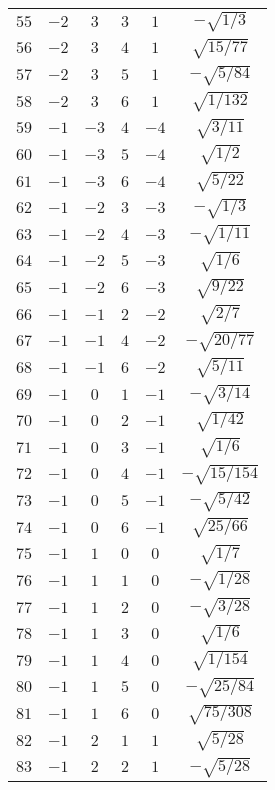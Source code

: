 \begin{table}
\begin{center}
\begin{tabular}{|c|c|c|c|c|c|}
$55$ & $-2$ & $3$ & $3$ & $1$ & $-\sqrt{1/3}$ \\ 
$56$ & $-2$ & $3$ & $4$ & $1$ & $\sqrt{15/77}$ \\ 
$57$ & $-2$ & $3$ & $5$ & $1$ & $-\sqrt{5/84}$ \\ 
$58$ & $-2$ & $3$ & $6$ & $1$ & $\sqrt{1/132}$ \\ 
$59$ & $-1$ & $-3$ & $4$ & $-4$ & $\sqrt{3/11}$ \\ 
$60$ & $-1$ & $-3$ & $5$ & $-4$ & $\sqrt{1/2}$ \\ 
$61$ & $-1$ & $-3$ & $6$ & $-4$ & $\sqrt{5/22}$ \\ 
$62$ & $-1$ & $-2$ & $3$ & $-3$ & $-\sqrt{1/3}$ \\ 
$63$ & $-1$ & $-2$ & $4$ & $-3$ & $-\sqrt{1/11}$ \\ 
$64$ & $-1$ & $-2$ & $5$ & $-3$ & $\sqrt{1/6}$ \\ 
$65$ & $-1$ & $-2$ & $6$ & $-3$ & $\sqrt{9/22}$ \\ 
$66$ & $-1$ & $-1$ & $2$ & $-2$ & $\sqrt{2/7}$ \\ 
$67$ & $-1$ & $-1$ & $4$ & $-2$ & $-\sqrt{20/77}$ \\ 
$68$ & $-1$ & $-1$ & $6$ & $-2$ & $\sqrt{5/11}$ \\ 
$69$ & $-1$ & $0$ & $1$ & $-1$ & $-\sqrt{3/14}$ \\ 
$70$ & $-1$ & $0$ & $2$ & $-1$ & $\sqrt{1/42}$ \\ 
$71$ & $-1$ & $0$ & $3$ & $-1$ & $\sqrt{1/6}$ \\ 
$72$ & $-1$ & $0$ & $4$ & $-1$ & $-\sqrt{15/154}$ \\ 
$73$ & $-1$ & $0$ & $5$ & $-1$ & $-\sqrt{5/42}$ \\ 
$74$ & $-1$ & $0$ & $6$ & $-1$ & $\sqrt{25/66}$ \\ 
$75$ & $-1$ & $1$ & $0$ & $0$ & $\sqrt{1/7}$ \\ 
$76$ & $-1$ & $1$ & $1$ & $0$ & $-\sqrt{1/28}$ \\ 
$77$ & $-1$ & $1$ & $2$ & $0$ & $-\sqrt{3/28}$ \\ 
$78$ & $-1$ & $1$ & $3$ & $0$ & $\sqrt{1/6}$ \\ 
$79$ & $-1$ & $1$ & $4$ & $0$ & $\sqrt{1/154}$ \\ 
$80$ & $-1$ & $1$ & $5$ & $0$ & $-\sqrt{25/84}$ \\ 
$81$ & $-1$ & $1$ & $6$ & $0$ & $\sqrt{75/308}$ \\ 
$82$ & $-1$ & $2$ & $1$ & $1$ & $\sqrt{5/28}$ \\ 
$83$ & $-1$ & $2$ & $2$ & $1$ & $-\sqrt{5/28}$ \\ 

\end{tabular}
\end{center}
\end{table}
